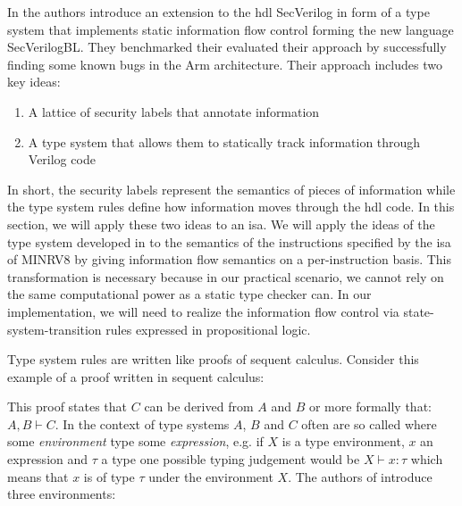 

In \cite{Ferraiuolo17} the authors introduce an extension to the \gls{hdl} SecVerilog in form of a type system that implements static information flow control forming the new language SecVerilogBL.
They benchmarked their evaluated their approach by successfully finding some known bugs in the Arm architecture.
Their approach includes two key ideas:
\begin{enumerate}
    \item A lattice of security labels that annotate information
    \item A type system that allows them to statically track information through Verilog code
\end{enumerate}
In short, the security labels represent the semantics of pieces of information while the type system rules define how information moves through the \gls{hdl} code.
In this section, we will apply these two ideas to an \gls{isa}.
We will apply the ideas of the type system developed in \cite{Ferraiuolo17} to the semantics of the instructions specified by the \gls{isa} of MINRV8 by giving information flow semantics on a per-instruction basis.
This transformation is necessary because in our practical scenario, we cannot rely on the same computational power as a static type checker can.
In our implementation, we will need to realize the information flow control via state-system-transition rules expressed in propositional logic.

Type system rules are written like proofs of sequent calculus.
Consider this example of a proof written in sequent calculus:
\begin{prooftree}
\end{prooftree}

This proof states that $ C $ can be derived from $ A $ and $ B $ or more formally that: $ A, B \vdash C $.
In the context of type systems $ A $, $ B $ and $ C $ often are so called  where some \textit{environment} type some \textit{expression}, e.g. if $ X $ is a type environment, $ x $ an expression and $ \tau $ a type one possible typing judgement would be $ X \vdash x : \tau $ which means that $ x $ is of type $ \tau $ under the environment $ X $.
The authors of \cite{Ferraiuolo17} introduce three environments:

